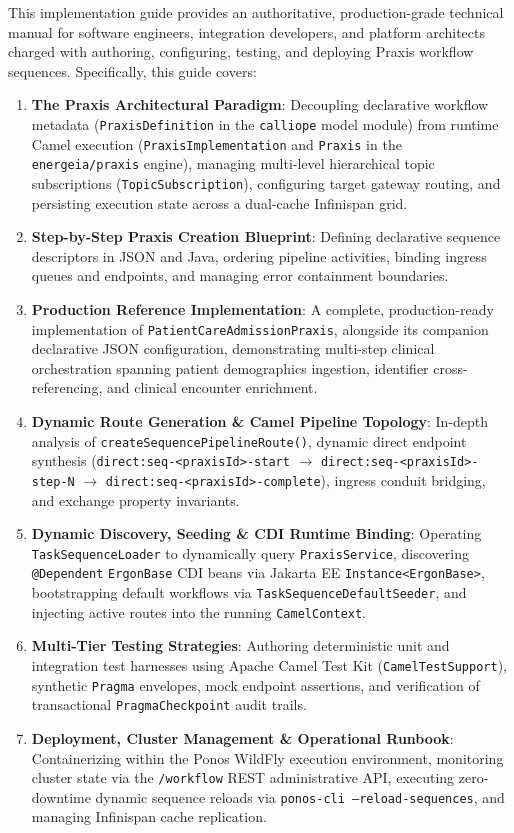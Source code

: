 This implementation guide provides an authoritative, production-grade technical manual for software engineers, integration developers, and platform architects charged with authoring, configuring, testing, and deploying Praxis workflow sequences. Specifically, this guide covers:
\begin{enumerate}
    \item \textbf{The Praxis Architectural Paradigm}: Decoupling declarative workflow metadata (\texttt{PraxisDefinition} in the \texttt{calliope} model module) from runtime Camel execution (\texttt{PraxisImplementation} and \texttt{Praxis} in the \texttt{energeia/praxis} engine), managing multi-level hierarchical topic subscriptions (\texttt{TopicSubscription}), configuring target gateway routing, and persisting execution state across a dual-cache Infinispan grid.
    \item \textbf{Step-by-Step Praxis Creation Blueprint}: Defining declarative sequence descriptors in JSON and Java, ordering pipeline activities, binding ingress queues and endpoints, and managing error containment boundaries.
    \item \textbf{Production Reference Implementation}: A complete, production-ready implementation of \texttt{PatientCareAdmissionPraxis}, alongside its companion declarative JSON configuration, demonstrating multi-step clinical orchestration spanning patient demographics ingestion, identifier cross-referencing, and clinical encounter enrichment.
    \item \textbf{Dynamic Route Generation \& Camel Pipeline Topology}: In-depth analysis of \texttt{createSequencePipelineRoute()}, dynamic direct endpoint synthesis (\texttt{direct:seq-<praxisId>-start} $\rightarrow$ \texttt{direct:seq-<praxisId>-step-N} $\rightarrow$ \texttt{direct:seq-<praxisId>-complete}), ingress conduit bridging, and exchange property invariants.
    \item \textbf{Dynamic Discovery, Seeding \& CDI Runtime Binding}: Operating \texttt{TaskSequenceLoader} to dynamically query \texttt{PraxisService}, discovering \texttt{@Dependent} \texttt{ErgonBase} CDI beans via Jakarta EE \texttt{Instance<ErgonBase>}, bootstrapping default workflows via \texttt{TaskSequenceDefaultSeeder}, and injecting active routes into the running \texttt{CamelContext}.
    \item \textbf{Multi-Tier Testing Strategies}: Authoring deterministic unit and integration test harnesses using Apache Camel Test Kit (\texttt{CamelTestSupport}), synthetic \texttt{Pragma} envelopes, mock endpoint assertions, and verification of transactional \texttt{PragmaCheckpoint} audit trails.
    \item \textbf{Deployment, Cluster Management \& Operational Runbook}: Containerizing within the Ponos WildFly execution environment, monitoring cluster state via the \texttt{/workflow} REST administrative API, executing zero-downtime dynamic sequence reloads via \texttt{ponos-cli --reload-sequences}, and managing Infinispan cache replication.
\end{enumerate}

